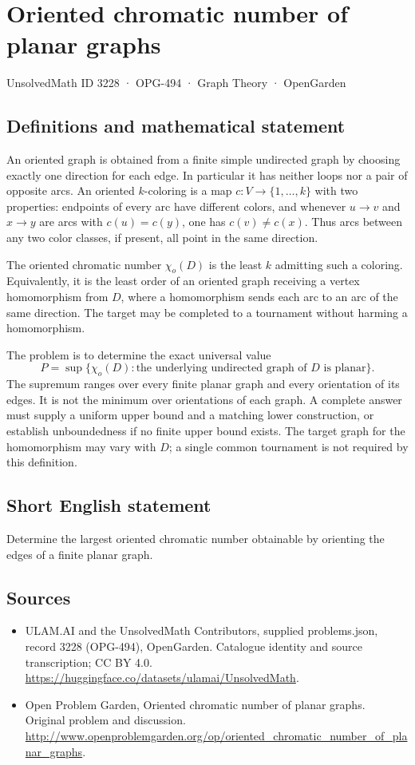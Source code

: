 \documentclass[11pt,a4paper]{article}
\begin{document}
\section*{Oriented chromatic number of planar graphs}\label{3228}
{\small UnsolvedMath ID 3228 · OPG-494 · Graph Theory · OpenGarden}
\subsection{Definitions and mathematical statement}
An oriented graph is obtained from a finite simple undirected graph by choosing exactly one direction for each edge. In particular it has neither loops nor a pair of opposite arcs. An oriented $k$-coloring is a map $c:V\to\{1,\ldots,k\}$ with two properties: endpoints of every arc have different colors, and whenever $u\to v$ and $x\to y$ are arcs with $c(u)=c(y)$, one has $c(v)\ne c(x)$. Thus arcs between any two color classes, if present, all point in the same direction.

The oriented chromatic number $\chi_o(D)$ is the least $k$ admitting such a coloring. Equivalently, it is the least order of an oriented graph receiving a vertex homomorphism from $D$, where a homomorphism sends each arc to an arc of the same direction. The target may be completed to a tournament without harming a homomorphism.

The problem is to determine the exact universal value
\[
 P=\sup\{\chi_o(D):\text{the underlying undirected graph of }D
                         \text{ is planar}\}.
\]
The supremum ranges over every finite planar graph and every orientation of its edges. It is not the minimum over orientations of each graph. A complete answer must supply a uniform upper bound and a matching lower construction, or establish unboundedness if no finite upper bound exists. The target graph for the homomorphism may vary with $D$; a single common tournament is not required by this definition.
\subsection{Short English statement}
Determine the largest oriented chromatic number obtainable by orienting the edges of a finite planar graph.
\subsection{Sources}
\begin{itemize}
\item[S1] ULAM.AI and the UnsolvedMath Contributors, supplied problems.json, record 3228 (OPG-494), OpenGarden. Catalogue identity and source transcription; CC BY 4.0.
\url{https://huggingface.co/datasets/ulamai/UnsolvedMath}.
\item[S2] Open Problem Garden, Oriented chromatic number of planar graphs. Original problem and discussion.
\url{http://www.openproblemgarden.org/op/oriented_chromatic_number_of_planar_graphs}.
\end{itemize}
\end{document}
